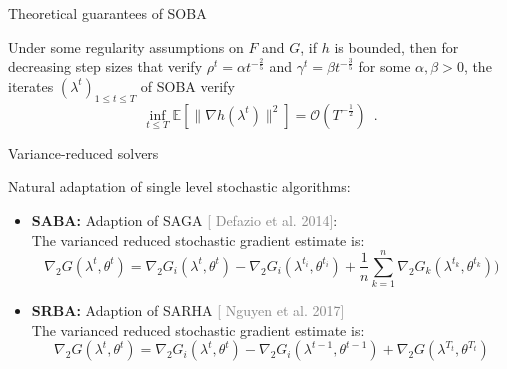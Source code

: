\documentclass{beamer}
\newcommand{\citeline}[1]{\textcolor{gray}{\small[{\color{linkcolor} #1}]}}
\begin{document}
\begin{frame}{Theoretical guarantees of SOBA}
    \begin{theorem}
        Under some regularity assumptions on $F$ and $G$, if $h$ is bounded, then for decreasing step sizes that verify $\rho^t = \alpha t^{-\frac25}$ and $\gamma^t = \beta t^{-\frac35}$ for some $\alpha, \beta>0$, the iterates $(\lambda^t)_{1\leq t\leq T}$ of SOBA verify
        $$
        \inf_{t\leq T} \mathbb E[\|\nabla h(\lambda^t)\|^2] = \mathcal O(T^{-\frac12})\enspace .
        $$
    \end{theorem}
\end{frame}


\begin{frame}{Variance-reduced solvers }

    Natural adaptation of single level stochastic algorithms:\\[1em]
    \begin{itemize}[<+->]
        \item[] \textbf{SABA:} Adaption of SAGA \citeline{Defazio et al. 2014}:\\[.5em]
        The varianced reduced stochastic gradient estimate is:
            $$
            \nabla_2G(\lambda^t, \theta^t) = \nabla_2 G_i(\lambda^t, \theta^t) - \nabla_2 G_i(\lambda^{t_i}, \theta^{t_i}) + \frac1n\sum_{k=1}^n \nabla_2 G_k(\lambda^{t_k}, \theta^{t_k}))
            $$
        \item[] \textbf{SRBA:} Adaption of SARHA \citeline{Nguyen et al. 2017}\\[.5em]
        The varianced reduced stochastic gradient estimate is:
            $$
            \nabla_2G(\lambda^t, \theta^t) = \nabla_2 G_i(\lambda^t, \theta^t) - \nabla_2 G_i(\lambda^{t-1}, \theta^{t-1}) + \nabla_2 G(\lambda^{T_t}, \theta^{T_t})
            $$
    \end{itemize}


\end{frame}
\end{document}
